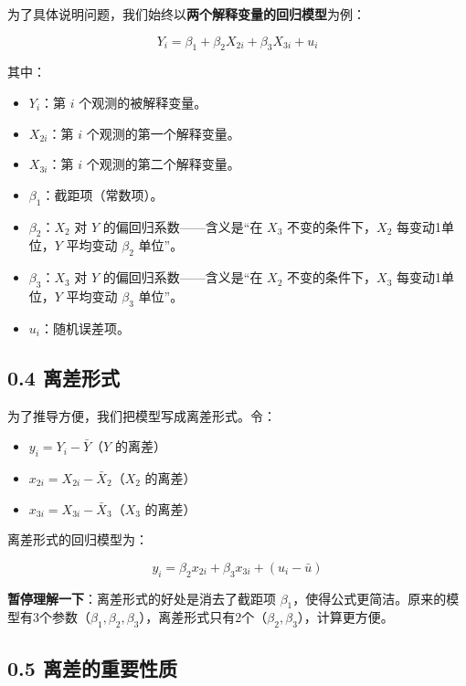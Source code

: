 \documentclass[12pt,a4paper]{ctexart}
\begin{document}
为了具体说明问题，我们始终以\textbf{两个解释变量的回归模型}为例：

\begin{equation}
Y_i = \beta_1 + \beta_2 X_{2i} + \beta_3 X_{3i} + u_i \tag{0.1}
\end{equation}

其中：
\begin{itemize}
    \item $Y_i$：第 $i$ 个观测的被解释变量。
    \item $X_{2i}$：第 $i$ 个观测的第一个解释变量。
    \item $X_{3i}$：第 $i$ 个观测的第二个解释变量。
    \item $\beta_1$：截距项（常数项）。
    \item $\beta_2$：$X_2$ 对 $Y$ 的偏回归系数——含义是“在 $X_3$ 不变的条件下，$X_2$ 每变动1单位，$Y$ 平均变动 $\beta_2$ 单位”。
    \item $\beta_3$：$X_3$ 对 $Y$ 的偏回归系数——含义是“在 $X_2$ 不变的条件下，$X_3$ 每变动1单位，$Y$ 平均变动 $\beta_3$ 单位”。
    \item $u_i$：随机误差项。
\end{itemize}

\subsection{0.4 离差形式}

为了推导方便，我们把模型写成离差形式。令：
\begin{itemize}
    \item $y_i = Y_i - \bar{Y}$（$Y$ 的离差）
    \item $x_{2i} = X_{2i} - \bar{X}_2$（$X_2$ 的离差）
    \item $x_{3i} = X_{3i} - \bar{X}_3$（$X_3$ 的离差）
\end{itemize}

离差形式的回归模型为：

\begin{equation}
y_i = \beta_2 x_{2i} + \beta_3 x_{3i} + (u_i - \bar{u}) \tag{4.4}
\end{equation}

\textbf{暂停理解一下}：离差形式的好处是消去了截距项 $\beta_1$，使得公式更简洁。原来的模型有3个参数（$\beta_1, \beta_2, \beta_3$），离差形式只有2个（$\beta_2, \beta_3$），计算更方便。

\subsection{0.5 离差的重要性质}
\end{document}
